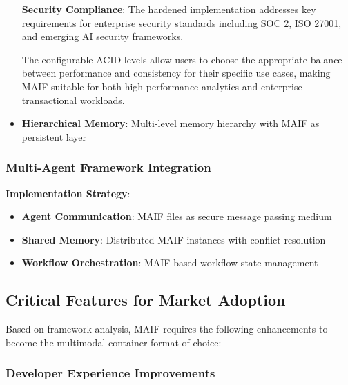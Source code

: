\documentclass[conference]{IEEEtran}
\begin{document}
\begin{itemize}[leftmargin=*]
\textbf{Security Compliance}: The hardened implementation addresses key requirements for enterprise security standards including SOC 2, ISO 27001, and emerging AI security frameworks.

The configurable ACID levels allow users to choose the appropriate balance between performance and consistency for their specific use cases, making MAIF suitable for both high-performance analytics and enterprise transactional workloads.
\item \textbf{Hierarchical Memory}: Multi-level memory hierarchy with MAIF as persistent layer
\end{itemize}

\subsubsection{Multi-Agent Framework Integration}

\textbf{Implementation Strategy}:
\begin{itemize}[leftmargin=*]
\item \textbf{Agent Communication}: MAIF files as secure message passing medium
\item \textbf{Shared Memory}: Distributed MAIF instances with conflict resolution
\item \textbf{Workflow Orchestration}: MAIF-based workflow state management
\end{itemize}

\subsection{Critical Features for Market Adoption}

Based on framework analysis, MAIF requires the following enhancements to become the multimodal container format of choice:

\subsubsection{Developer Experience Improvements}
\end{document}
